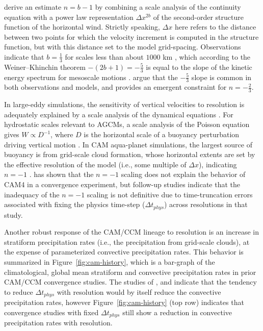 \documentclass[times]{qjrms4}
\begin{document}
\cite{RETAL2016CD} derive an estimate $n= b-1$ by combining a scale analysis of the continuity equation with a power law representation $\Delta x^{2b}$ of the second-order structure function of the horizontal wind. Strictly speaking, $\Delta x$ here refers to the distance between two points for which the velocity increment is computed in the structure function, but with this distance set to the model grid-spacing. Observations indicate that $b=\frac{1}{3}$ for scales less than about $1000$ km \citep{CETAL1999JGR}, which according to the Weiner–Khinchin theorem $- \left( 2b+1 \right) = -\frac{5}{3}$ is equal to the slope of the kinetic energy spectrum for mesoscale motions \citep{NG1985JAS}. \cite{RETAL2016CD} argue that the $-\frac{5}{3}$ slope is common in both observations and models, and provides an emergent constraint for $n= -\frac{2}{3}$.

In large-eddy simulations, the sensitivity of vertical velocities to resolution is adequately explained by a scale analysis of the dynamical equations \citep{WETAL1997MWR,PG2006JAS,JR2016QJRMS}. For hydrostatic scales relevant to AGCMs, a scale analysis of the Poisson equation gives $W \propto D^{-1}$, where $D$ is the horizontal scale of a buoyancy perturbation driving vertical motion \citep{HR2018JAMES}. In CAM aqua-planet simulations, the largest source of buoyancy is from grid-scale cloud formation, whose horizontal extents are set by the effective resolution of the model (i.e., some multiple of $\Delta x$), indicating $n=-1$ \citep{HR2018JAMES}. \cite{HR2017JCLIM} has shown that the $n=-1$ scaling does not explain the behavior of CAM4 in a convergence experiment, but follow-up studies \citep{HR2018JAMES,HETAL2019JAMES} indicate that the inadequacy of the $n=-1$ scaling is not definitive due to time-truncation errors associated with fixing the physics time-step ($\Delta t_{phys}$) across resolutions in that study.

Another robust response of the CAM/CCM lineage to resolution is an increase in stratiform precipitation rates (i.e., the precipitation from grid-scale clouds), at the expense of parameterized convective precipitation rates. This behavior is summarized in Figure~\ref{fig:cam-history}, which is a bar-graph of the climatological, global mean stratiform and convective precipitation rates in prior CAM/CCM convergence studies. The studies of \cite{KW1991JGR}, \cite{WETAL1995CD} and \cite{W2013QJRMS} indicate that the tendency to reduce $\Delta t_{phys}$ with resolution would by itself reduce the convective precipitation rates, however Figure~\ref{fig:cam-history} (top row) indicates that convergence studies with fixed $\Delta t_{phys}$ still show a reduction in convective precipitation rates with resolution.
\end{document}
